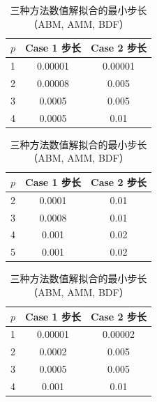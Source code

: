 \documentclass[a4paper]{article}
\begin{document}
\begin{table}
    \centering
    \caption{三种方法数值解拟合的最小步长（ABM, AMM, BDF）}
    \begin{tabular}{|c|c|c|}
        \hline
        $p$ & Case 1 步长 & Case 2 步长 \\
        \hline
        1 & 0.00001 & 0.00001 \\
        2 & 0.00008 & 0.005 \\
        3 & 0.0005 & 0.005 \\
        4 & 0.0005 & 0.01 \\
        \hline 
    \end{tabular}
    \begin{tabular}{|c|c|c|}
        \hline
        $p$ & Case 1 步长 & Case 2 步长 \\
        \hline
        2 & 0.0001 & 0.01 \\
        3 & 0.0008 & 0.01 \\
        4 & 0.001 & 0.02 \\
        5 & 0.001 & 0.02 \\
        \hline 
    \end{tabular}
    \begin{tabular}{|c|c|c|}
        \hline
        $p$ & Case 1 步长 & Case 2 步长 \\
        \hline
        1 & 0.00001 & 0.00002 \\
        2 & 0.0002 & 0.005 \\
        3 & 0.0005 & 0.005 \\
        4 & 0.001 & 0.01 \\
        \hline 
    \end{tabular}
\end{table}

\printbibliography
\end{document}
